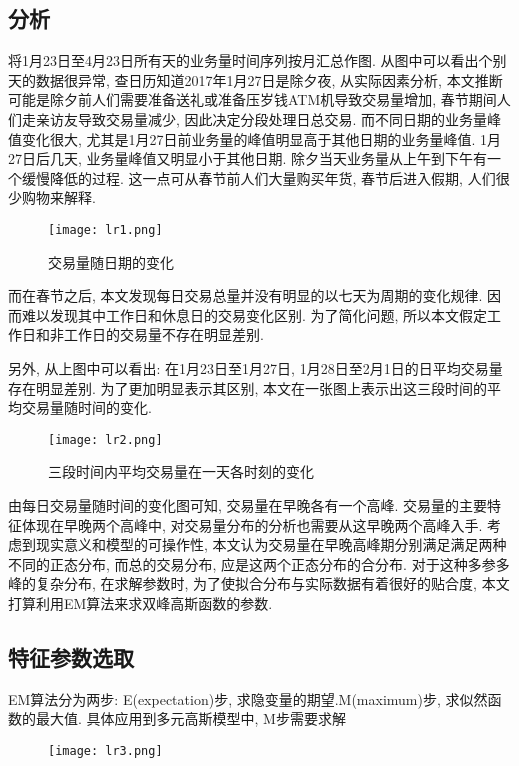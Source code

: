 \subsection{分析}

将1月23日至4月23日所有天的业务量时间序列按月汇总作图. 从图中可以看出个别天的数据很异常, 查日历知道2017年1月27日是除夕夜, 从实际因素分析, 本文推断可能是除夕前人们需要准备送礼或准备压岁钱ATM机导致交易量增加, 春节期间人们走亲访友导致交易量减少, 因此决定分段处理日总交易. 而不同日期的业务量峰值变化很大, 尤其是1月27日前业务量的峰值明显高于其他日期的业务量峰值. 1月27日后几天, 业务量峰值又明显小于其他日期. 除夕当天业务量从上午到下午有一个缓慢降低的过程. 这一点可从春节前人们大量购买年货, 春节后进入假期, 人们很少购物来解释.

\begin{figure}[H]
    \centering
    \texttt{[image: lr1.png]}
    \caption{交易量随日期的变化}
\end{figure}

而在春节之后, 本文发现每日交易总量并没有明显的以七天为周期的变化规律. 因而难以发现其中工作日和休息日的交易变化区别. 为了简化问题, 所以本文假定工作日和非工作日的交易量不存在明显差别.

另外, 从上图中可以看出: 在1月23日至1月27日, 1月28日至2月1日的日平均交易量存在明显差别. 为了更加明显表示其区别, 本文在一张图上表示出这三段时间的平均交易量随时间的变化.

\begin{figure}[H]
    \centering
    \texttt{[image: lr2.png]}
    \caption{三段时间内平均交易量在一天各时刻的变化}
\end{figure}

由每日交易量随时间的变化图可知, 交易量在早晚各有一个高峰. 交易量的主要特征体现在早晚两个高峰中, 对交易量分布的分析也需要从这早晚两个高峰入手. 考虑到现实意义和模型的可操作性, 本文认为交易量在早晚高峰期分别满足满足两种不同的正态分布, 而总的交易分布, 应是这两个正态分布的合分布. 对于这种多参多峰的复杂分布, 在求解参数时, 为了使拟合分布与实际数据有着很好的贴合度, 本文打算利用EM算法来求双峰高斯函数的参数.

\subsection{特征参数选取}

EM算法分为两步: E(expectation)步, 求隐变量的期望.M(maximum)步, 求似然函数的最大值. 具体应用到多元高斯模型中, M步需要求解
\begin{figure}[H]
    \centering
    \texttt{[image: lr3.png]}
\end{figure}

